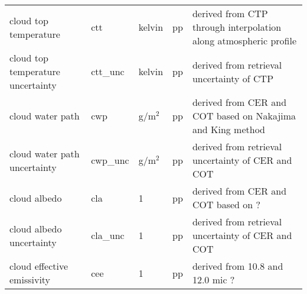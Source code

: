 \begin{table*}[h]
\begin{tabular}{l|l|l|l|l}
    cloud top temperature & ctt & kelvin & pp & derived from CTP through interpolation along atmospheric profile \\
    cloud top temperature uncertainty & ctt\_unc & kelvin & pp & derived from retrieval uncertainty of CTP \\
    cloud water path & cwp & g/m$^2$ & pp & derived from CER and COT based on Nakajima and King method \\
    cloud water path uncertainty & cwp\_unc & g/m$^2$ & pp & derived from retrieval uncertainty of CER and COT \\
    cloud albedo & cla & 1 & pp & derived from CER and COT based on ? \\
    cloud albedo uncertainty & cla\_unc & 1 & pp & derived from retrieval uncertainty of CER and COT \\
    cloud effective emissivity & cee & 1 & pp & derived from 10.8 and 12.0 mic ? \\
    \hline
  \end{tabular}
  \label{tab:L2_variables}
\end{table*}
